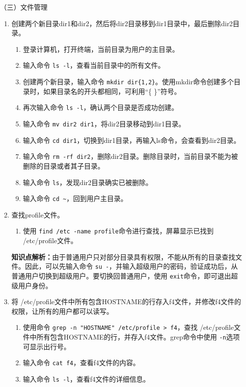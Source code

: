 \vspace{0.1in}
（三）文件管理
\begin{enumerate}
  \item 创建两个新目录dir1和dir2，然后将dir2目录移到dir1目录中，最后删除dir2目录。
    \begin{enumerate}
      \item 登录计算机，打开终端，当前目录为用户的主目录。
      \item 输入命令 \verb|ls -l|，查看当前目录中的所有文件。
      \item 创建两个新目录，输入命令 \verb|mkdir dir{1,2}|。使用mkdir命令创建多个目录时，如果目录名的开头都相同，可利用“\{ \}”符号。
      \item 再次输入命令 \verb|ls -l|，确认两个目录是否成功创建。
      \item 输入命令 \verb|mv dir2 dir1|，将dir2目录移动到dir1目录。
      \item 输入命令 \verb|cd dir1|，切换到dir1目录，再输入ls命令，会查看到dir2目录。
      \item 输入命令 \verb|rm -rf dir2|，删除dir2目录。删除目录时，当前目录不能为被删除的目录或者其子目录。
      \item 输入命令 \verb|ls|，发现dir2目录确实已被删除。
      \item 输入命令 \verb|cd ~|，回到用户主目录。
    \end{enumerate}
  \item 查找profile文件。
    \begin{enumerate}
      \item 使用 \verb|find /etc -name profile|命令进行查找，屏幕显示已找到 /etc/profile文件。
    \end{enumerate}
    \textbf{知识点解析：}由于普通用户只对部分目录具有权限，不能从所有的目录查找文件。因此，可以先输入命令 \verb|su -|，并输入超级用户的密码，验证成功后，从普通用户切换到超级用户。要切换回普通用户，使用 \verb|exit|命令，即可退出超级用户身份。
  \item 将 /etc/profile文件中所有包含HOSTNAME的行存入f4文件，并修改f4文件的权限，让所有的用户都可以读写。
    \begin{enumerate}
      \item 使用命令 \verb|grep -n "HOSTNAME" /etc/profile > f4|，查找 /etc/profile文件中所有包含HOSTNAME的行，并存入f4文件。grep命令中使用 \verb|-n|选项可显示出行号。
      \item 输入命令 \verb|cat f4|，查看f4文件的内容。
      \item 输入命令 \verb|ls -l|，查看f4文件的详细信息。

\end{enumerate}
\end{enumerate}
